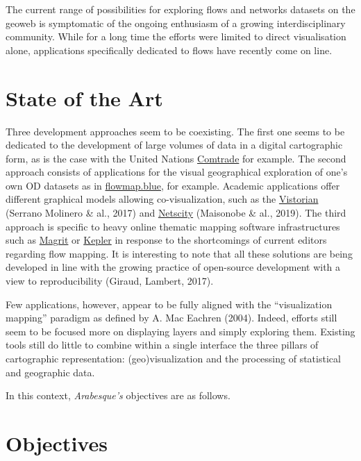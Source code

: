 \documentclass[
  letterpaper,
  DIV=11,
  numbers=noendperiod]{scrreprt}
\begin{document}
The current range of possibilities for exploring flows and networks
datasets on the geoweb is symptomatic of the ongoing enthusiasm of a
growing interdisciplinary community. While for a long time the efforts
were limited to direct visualisation alone, applications specifically
dedicated to flows have recently come on line.

\section{State of the Art}\label{state-of-the-art}

Three development approaches seem to be coexisting. The first one seems
to be dedicated to the development of large volumes of data in a digital
cartographic form, as is the case with the United Nations
\href{https://comtrade.un.org/}{Comtrade} for example. The second
approach consists of applications for the visual geographical
exploration of one's own OD datasets as in
\href{https://flowmap.blue/}{flowmap.blue}, for example. Academic
applications offer different graphical models allowing co-visualization,
such as the
\href{https://networkcube.github.io/vistorian/index.html}{Vistorian}
(Serrano Molinero \& al., 2017) and
\href{https://www.irit.fr/netscity/}{Netscity} (Maisonobe \& al., 2019).
The third approach is specific to heavy online thematic mapping software
infrastructures such as \hyperref[0]{Magrit} or \hyperref[0]{Kepler} in
response to the shortcomings of current editors regarding flow mapping.
It is interesting to note that all these solutions are being developed
in line with the growing practice of open-source development with a view
to reproducibility (Giraud, Lambert, 2017).

Few applications, however, appear to be fully aligned with the
``visualization mapping'' paradigm as defined by A. Mac Eachren (2004).
Indeed, efforts still seem to be focused more on displaying layers and
simply exploring them. Existing tools still do little to combine within
a single interface the three pillars of cartographic representation:
(geo)visualization and the processing of statistical and geographic
data.

In this context, \emph{Arabesque's} objectives are as follows.

\section{Objectives}\label{objectives}
\end{document}
